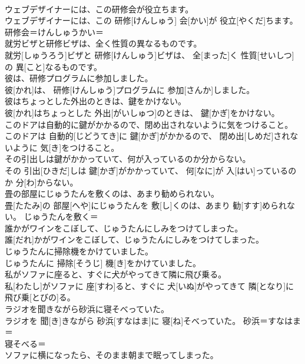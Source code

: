 \documentclass[8pt]{extreport}
\begin{document}
\begin{CJK}{UTF8}{min}
\\	ウェブデザイナーには、この研修会が役立ちます。	
\\	ウェブデザイナーには、この 研修[けんしゅう] 会[かい]が 役立[やくだ]ちます。	研修会＝けんしゅうかい＝ 
\\	就労ビザと研修ビザは、全く性質の異なるものです。	
\\	就労[しゅうろう]ビザと 研修[けんしゅう]ビザは、 全[まった]く 性質[せいしつ]の 異[こと]なるものです。	
\\	彼は、研修プログラムに参加しました。	
\\	彼[かれ]は、 研修[けんしゅう]プログラムに 参加[さんか]しました。	
\\	彼はちょっとした外出のときは、鍵をかけない。	
\\	彼[かれ]はちょっとした 外出[がいしゅつ]のときは、 鍵[かぎ]をかけない。	
\\	このドアは自動的に鍵がかかるので、閉め出されないように気をつけること。	
\\	このドアは 自動的[じどうてき]に 鍵[かぎ]がかかるので、 閉め出[しめだ]されないように 気[き]をつけること。	
\\	その引出しは鍵がかかっていて、何が入っているのか分からない。	
\\	その 引出[ひきだ]しは 鍵[かぎ]がかかっていて、 何[なに]が 入[はい]っているのか 分[わ]からない。	
\\	畳の部屋にじゅうたんを敷くのは、あまり勧められない。	
\\	畳[たたみ]の 部屋[へや]にじゅうたんを 敷[し]くのは、あまり 勧[すす]められない。	じゅうたんを敷く＝ 
\\	誰かがワインをこぼして、じゅうたんにしみをつけてしまった。	
\\	誰[だれ]かがワインをこぼして、じゅうたんにしみをつけてしまった。	
\\	じゅうたんに掃除機をかけていました。	
\\	じゅうたんに 掃除[そうじ] 機[き]をかけていました。	
\\	私がソファに座ると、すぐに犬がやってきて隣に飛び乗る。	
\\	私[わたし]がソファに 座[すわ]ると、すぐに 犬[いぬ]がやってきて 隣[となり]に 飛び乗[とびの]る。	
\\	ラジオを聞きながら砂浜に寝そべっていた。	
\\	ラジオを 聞[き]きながら 砂浜[すなはま]に 寝[ね]そべっていた。	砂浜＝すなはま＝ 
\\	寝そべる＝ 
\\	ソファに横になったら、そのまま朝まで眠ってしまった。	

\end{CJK}
\end{document}
